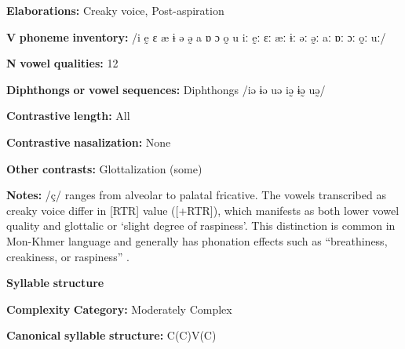 \documentclass[output=paper]{langsci/langscibook}
\begin{document}
\begin{styleBody}
\textbf{Elaborations:} Creaky voice, Post-aspiration
\end{styleBody}

\begin{styleBody}
\textbf{V} \textbf{phoneme} \textbf{inventory:} /i ḛ ɛ æ ɨ ə ə̰ a ɒ ɔ o̰ u iː ḛː ɛː æː ɨː əː ə̰ː aː ɒː ɔː o̰ː uː/
\end{styleBody}

\begin{styleBody}
\textbf{N} \textbf{vowel} \textbf{qualities:} 12
\end{styleBody}

\begin{styleBody}
\textbf{Diphthongs} \textbf{or} \textbf{vowel} \textbf{sequences:} Diphthongs /iə ɨə uə iə̰ ɨə̰ uə̰/
\end{styleBody}

\begin{styleBody}
\textbf{Contrastive} \textbf{length:} All
\end{styleBody}

\begin{styleBody}
\textbf{Contrastive} \textbf{nasalization:} None
\end{styleBody}

\begin{styleBody}
\textbf{Other} \textbf{contrasts:} Glottalization (some)
\end{styleBody}

\begin{styleBody}
\textbf{Notes:} /ç/ ranges from alveolar to palatal fricative. The vowels transcribed as creaky voice differ in [RTR] value ([+RTR]), which manifests as both lower vowel quality and glottalic or ‘slight degree of raspiness’. This distinction is common in Mon-Khmer language and generally has phonation effects such as “breathiness, creakiness, or raspiness” \citep[14]{Alves2006}.
\end{styleBody}

\begin{styleBody}
\textbf{Syllable} \textbf{structure}
\end{styleBody}

\begin{styleBody}
\textbf{Complexity} \textbf{Category:} Moderately Complex
\end{styleBody}

\begin{styleBody}
\textbf{Canonical} \textbf{syllable} \textbf{structure:} C(C)V(C) \citep[17-21]{Alves2006}
\end{styleBody}
\end{document}
